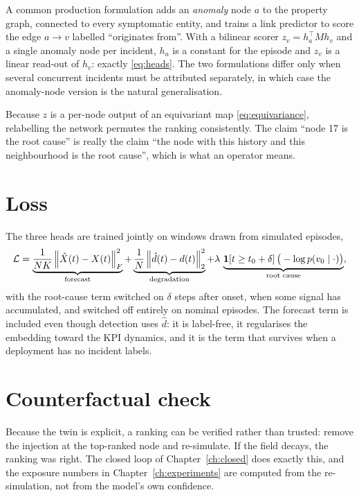 \begin{remark}
\label{rem:linkpred}
A common production formulation adds an \emph{anomaly} node $a$ to the property graph, connected
to every symptomatic entity, and trains a link predictor to score the edge $a\to v$ labelled
``originates from''. With a bilinear scorer $z_v=h_a^{\top}Mh_v$ and a single anomaly node per
incident, $h_a$ is a constant for the episode and $z_v$ is a linear read-out of $h_v$: exactly
\eqref{eq:heads}. The two formulations differ only when several concurrent incidents must be
attributed separately, in which case the anomaly-node version is the natural generalisation.
\end{remark}

\begin{remark}
Because $z$ is a per-node output of an equivariant map \eqref{eq:equivariance}, relabelling the
network permutes the ranking consistently. The claim ``node 17 is the root cause'' is really the
claim ``the node with this history and this neighbourhood is the root cause'', which is what an
operator means.
\end{remark}

\section{Loss}
The three heads are trained jointly on windows drawn from simulated episodes,
\begin{equation}
\mathcal L=\underbrace{\frac1{NK}\left\lVert \hat X(t)-X(t) \right\rVert_F^2}_{\text{forecast}}
+\underbrace{\frac1N\left\lVert \hat d(t)-d(t) \right\rVert_2^2}_{\text{degradation}}
+\lambda\,\underbrace{\mathbf{1}\!\left[t\ge t_0+\delta\right]\big(-\log p(v_0\mid\cdot)\big)}_{\text{root cause}},
\label{eq:loss}
\end{equation}
with the root-cause term switched on $\delta$ steps after onset, when some signal has
accumulated, and switched off entirely on nominal episodes. The forecast term is included even
though detection uses $\hat d$: it is label-free, it regularises the embedding toward the KPI
dynamics, and it is the term that survives when a deployment has no incident labels.

\section{Counterfactual check}
Because the twin is explicit, a ranking can be verified rather than trusted: remove the injection
at the top-ranked node and re-simulate. If the field decays, the ranking was right. The closed loop
of Chapter~\ref{ch:closed} does exactly this, and the exposure numbers in
Chapter~\ref{ch:experiments} are computed from the re-simulation, not from the model's own
confidence.
